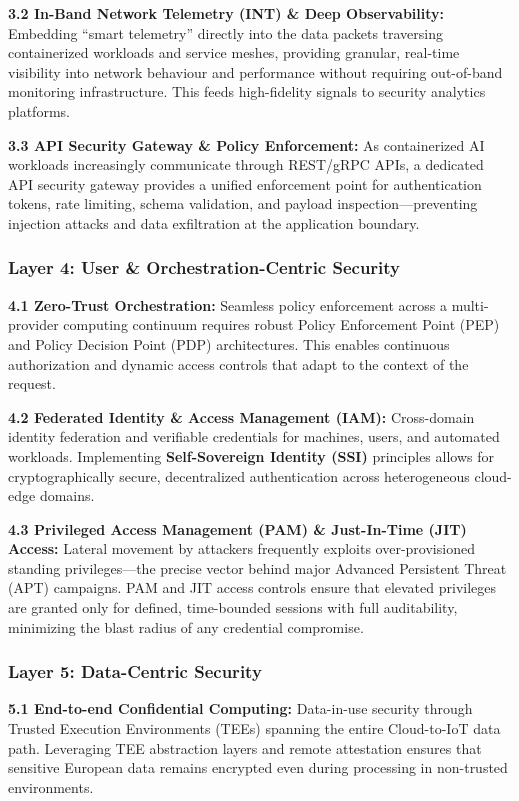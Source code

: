 \documentclass[12pt,a4paper]{article}
\begin{document}
\textbf{3.2 In-Band Network Telemetry (INT) \& Deep Observability:} Embedding ``smart telemetry'' directly into the data packets traversing containerized workloads and service meshes, providing granular, real-time visibility into network behaviour and performance without requiring out-of-band monitoring infrastructure. This feeds high-fidelity signals to security analytics platforms.

\textbf{3.3 API Security Gateway \& Policy Enforcement:} As containerized AI workloads increasingly communicate through REST/gRPC APIs, a dedicated API security gateway provides a unified enforcement point for authentication tokens, rate limiting, schema validation, and payload inspection---preventing injection attacks and data exfiltration at the application boundary.


\subsubsection*{Layer 4: User \& Orchestration-Centric Security}
\textbf{4.1 Zero-Trust Orchestration:} Seamless policy enforcement across a multi-provider computing continuum requires robust Policy Enforcement Point (PEP) and Policy Decision Point (PDP) architectures. This enables continuous authorization and dynamic access controls that adapt to the context of the request.

\textbf{4.2 Federated Identity \& Access Management (IAM):} Cross-domain identity federation and verifiable credentials for machines, users, and automated workloads. Implementing \textbf{Self-Sovereign Identity (SSI)} principles allows for cryptographically secure, decentralized authentication across heterogeneous cloud-edge domains.

\textbf{4.3 Privileged Access Management (PAM) \& Just-In-Time (JIT) Access:} Lateral movement by attackers frequently exploits over-provisioned standing privileges---the precise vector behind major Advanced Persistent Threat (APT) campaigns. PAM and JIT access controls ensure that elevated privileges are granted only for defined, time-bounded sessions with full auditability, minimizing the blast radius of any credential compromise.

\subsubsection*{Layer 5: Data-Centric Security}
\textbf{5.1 End-to-end Confidential Computing:} Data-in-use security through Trusted Execution Environments (TEEs) spanning the entire Cloud-to-IoT data path. Leveraging TEE abstraction layers and remote attestation ensures that sensitive European data remains encrypted even during processing in non-trusted environments.
\end{document}
